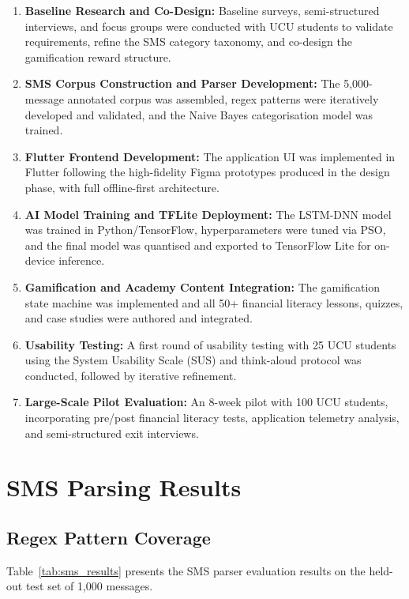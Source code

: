 \documentclass[12pt,a4paper]{report}
\begin{document}
\begin{enumerate}
    \item \textbf{Baseline Research and Co-Design:} Baseline surveys, semi-structured interviews, and focus groups were conducted with UCU students to validate requirements, refine the SMS category taxonomy, and co-design the gamification reward structure.
    \item \textbf{SMS Corpus Construction and Parser Development:} The 5,000-message annotated corpus was assembled, regex patterns were iteratively developed and validated, and the Naive Bayes categorisation model was trained.
    \item \textbf{Flutter Frontend Development:} The application UI was implemented in Flutter following the high-fidelity Figma prototypes produced in the design phase, with full offline-first architecture.
    \item \textbf{AI Model Training and TFLite Deployment:} The LSTM-DNN model was trained in Python/TensorFlow, hyperparameters were tuned via PSO, and the final model was quantised and exported to TensorFlow Lite for on-device inference.
    \item \textbf{Gamification and Academy Content Integration:} The gamification state machine was implemented and all 50+ financial literacy lessons, quizzes, and case studies were authored and integrated.
    \item \textbf{Usability Testing:} A first round of usability testing with 25 UCU students using the System Usability Scale (SUS) and think-aloud protocol was conducted, followed by iterative refinement.
    \item \textbf{Large-Scale Pilot Evaluation:} An 8-week pilot with 100 UCU students, incorporating pre/post financial literacy tests, application telemetry analysis, and semi-structured exit interviews.
\end{enumerate}

\section{SMS Parsing Results}

\subsection{Regex Pattern Coverage}

Table~\ref{tab:sms_results} presents the SMS parser evaluation results on the held-out
test set of 1,000 messages.
\end{document}
